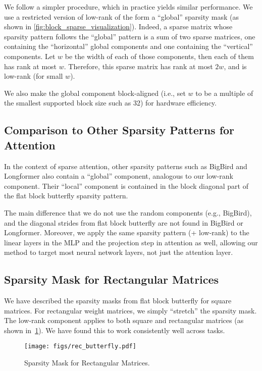 We follow a simpler procedure, which in practice yields similar performance.
We use a restricted version of low-rank of the form a ``global'' sparsity mask
(as shown in \cref{fig:block_sparse_visualization}).
Indeed, a sparse matrix whose sparsity pattern follows the ``global'' pattern is
a sum of two sparse matrices, one containing the ``horizontal'' global components
and one containing the ``vertical'' components.
Let $w$ be the width of each of those components, then each of them has rank at
most $w$.
Therefore, this sparse matrix has rank at most $2w$, and is low-rank (for small $w$).

We also make the global component block-aligned (i.e., set $w$ to be a multiple
of the smallest supported block size such as 32) for hardware efficiency.

\subsection{Comparison to Other Sparsity Patterns for Attention}

In the context of sparse attention, other sparsity patterns such as BigBird and
Longformer also contain a ``global'' component, analogous to our low-rank
component.
Their ``local'' component is contained in the block diagonal part of the flat
block butterfly sparsity pattern.

The main difference that we do not use the random components (e.g., BigBird),
and the diagonal strides from flat block butterfly are not found in BigBird or
Longformer.
Moreover, we apply the same sparsity pattern (+ low-rank) to the linear layers
in the MLP and the projection step in attention as well, allowing our method to
target most neural network layers, not just the attention layer.

\subsection{Sparsity Mask for Rectangular Matrices}

We have described the sparsity masks from flat block butterfly for square
matrices.
For rectangular weight matrices, we simply ``stretch'' the sparsity mask.
The low-rank component applies to both square and rectangular matrices (as shown in~\cref{fig:rec}).
We have found this to work consistently well across tasks.
\begin{figure}[ht]
  \centering
  \texttt{[image: figs/rec\_butterfly.pdf]}
  \caption{\label{fig:rec} Sparsity Mask for Rectangular Matrices.}
\end{figure}


